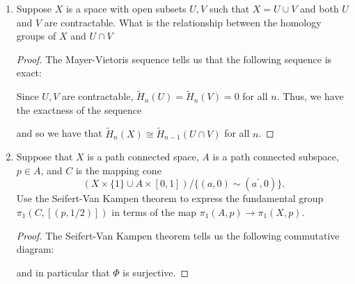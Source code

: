 \documentclass{article}
\begin{document}
\begin{enumerate}
	
\item Suppose $X$ is a space with open subsets $U,V$ such that $X = U \cup V$ and both $U$ and $V$ are contractable. What is the relationship between the homology groups of $X$ and $U\cap V$

\begin{proof}
The Mayer-Vietoris sequence tells us that the following sequence is exact:


Since $U,V$ are contractable, $\tilde{H}_n(U) = \tilde{H}_n(V) = 0$ for all $n$. Thus, we have the exactness of the sequence

\begin{center}
 \end{center}

and so we have that $\tilde{H}_n (X) \cong \tilde{H}_{n-1}(U \cap V)$ for all $n$. 

\end{proof}

\item Suppose that $X$ is a path connected space, $A$ is a path connected subspace, $p \in A$, and $C$ is the mapping cone
\[ \left ( X \times \{1\} \cup A \times [0 ,1 ] \right ) / \{ (a,0) \sim (a^\prime,0) \}. \]
Use the Seifert-Van Kampen theorem to express the fundamental group $\pi_1 (C, [(p, 1/2)])$ in terms of the map $\pi_1 (A,p) \rightarrow \pi_1(X,p)$.

\begin{proof}
The Seifert-Van Kampen theorem tells us the following commutative diagram:
\begin{center}
\end{center}
and in particular that $\Phi$ is surjective.


\end{proof}
\end{enumerate}
\end{document}
